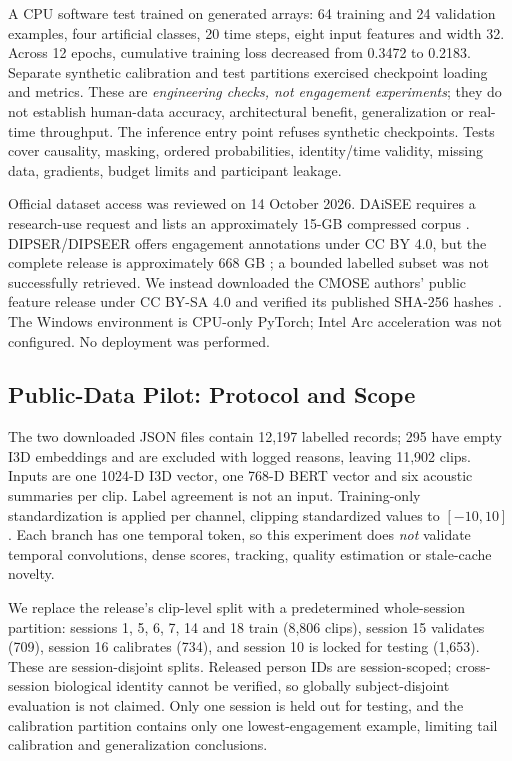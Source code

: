 \documentclass[a4paper,conference]{IEEEtran}
\begin{document}
A CPU software test trained on generated arrays: 64 training and 24 validation examples, four artificial classes, 20 time steps, eight input features and width 32. Across 12 epochs, cumulative training loss decreased from 0.3472 to 0.2183. Separate synthetic calibration and test partitions exercised checkpoint loading and metrics. These are \emph{engineering checks, not engagement experiments}; they do not establish human-data accuracy, architectural benefit, generalization or real-time throughput. The inference entry point refuses synthetic checkpoints. Tests cover causality, masking, ordered probabilities, identity/time validity, missing data, gradients, budget limits and participant leakage.

Official dataset access was reviewed on 14 October 2026. DAiSEE requires a research-use request and lists an approximately 15-GB compressed corpus \cite{daiseeaccess}. DIPSER/DIPSEER offers engagement annotations under CC BY 4.0, but the complete release is approximately 668 GB \cite{dipser}; a bounded labelled subset was not successfully retrieved. We instead downloaded the CMOSE authors' public feature release under CC BY-SA 4.0 and verified its published SHA-256 hashes \cite{cmose}. The Windows environment is CPU-only PyTorch; Intel Arc acceleration was not configured. No deployment was performed.

\subsection{Public-Data Pilot: Protocol and Scope}
The two downloaded JSON files contain 12,197 labelled records; 295 have empty I3D embeddings and are excluded with logged reasons, leaving 11,902 clips. Inputs are one 1024-D I3D vector, one 768-D BERT vector and six acoustic summaries per clip. Label agreement is not an input. Training-only standardization is applied per channel, clipping standardized values to $[-10,10]$. Each branch has one temporal token, so this experiment does \emph{not} validate temporal convolutions, dense scores, tracking, quality estimation or stale-cache novelty.

We replace the release's clip-level split with a predetermined whole-session partition: sessions 1, 5, 6, 7, 14 and 18 train (8,806 clips), session 15 validates (709), session 16 calibrates (734), and session 10 is locked for testing (1,653). These are session-disjoint splits. Released person IDs are session-scoped; cross-session biological identity cannot be verified, so globally subject-disjoint evaluation is not claimed. Only one session is held out for testing, and the calibration partition contains only one lowest-engagement example, limiting tail calibration and generalization conclusions.
\end{document}
